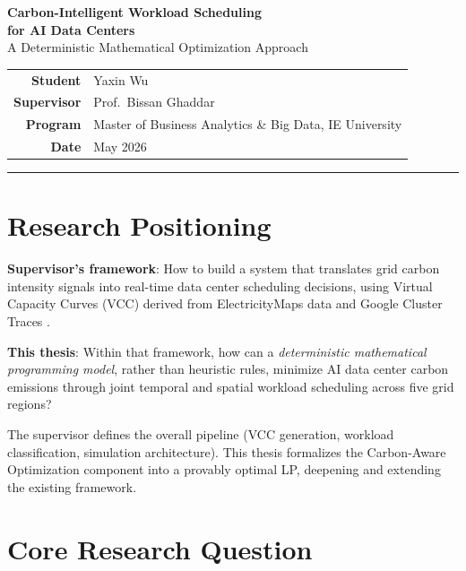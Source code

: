 \documentclass[11pt, a4paper]{article}
\begin{document}
\begin{center}
  {\LARGE\bfseries\color{ieblue}
    Carbon-Intelligent Workload Scheduling\\[4pt]
    for AI Data Centers}\\[10pt]
  {\large A Deterministic Mathematical Optimization Approach}\\[18pt]
  \begin{tabular}{rl}
    \textbf{Student}     & Yaxin Wu \\
    \textbf{Supervisor}  & Prof.\ Bissan Ghaddar \\
    \textbf{Program}     & Master of Business Analytics \& Big Data, IE University \\
    \textbf{Date}        & May 2026 \\
  \end{tabular}
\end{center}

\vspace{6pt}
\noindent\rule{\linewidth}{1.5pt}
\vspace{4pt}

\section{Research Positioning}

\textbf{Supervisor's framework}: How to build a system that translates grid carbon intensity signals into real-time data center scheduling decisions, using Virtual Capacity Curves (VCC) derived from ElectricityMaps data and Google Cluster Traces \citep{colangelo2025}.

\textbf{This thesis}: Within that framework, how can a \emph{deterministic mathematical programming model}, rather than heuristic rules, minimize AI data center carbon emissions through joint temporal and spatial workload scheduling across five grid regions?

The supervisor defines the overall pipeline (VCC generation, workload classification, simulation architecture). This thesis formalizes the Carbon-Aware Optimization component into a provably optimal LP, deepening and extending the existing framework.

\section{Core Research Question}
\end{document}
